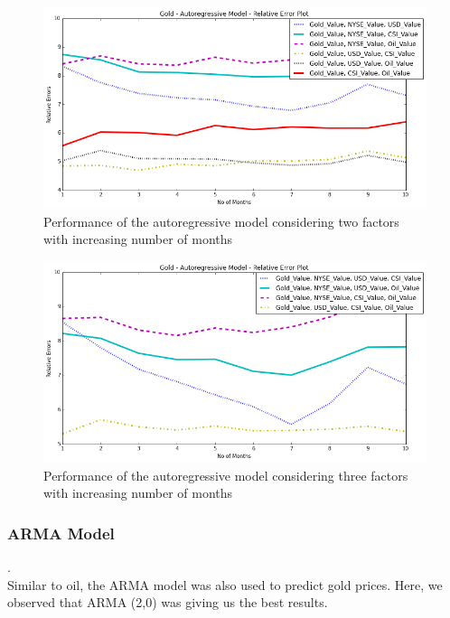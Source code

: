 \documentclass[runningheads]{llncs}
\begin{document}
\begin{figure}
\centering
\includegraphics[width=\textwidth]{gold_autoregressive_2factors_10.png}
\caption{Performance of the autoregressive model considering two factors with increasing number of months}
\label{fig:gold_autoregressive_2factors_10.png}
\end{figure}

\begin{figure}
\centering
\includegraphics[width=\textwidth]{gold_autoregressive_3factors_10.png}
\caption{Performance of the autoregressive model considering three factors with increasing number of months}
\label{fig:gold_autoregressive_3factors_10.png}
\end{figure}

\newpage
\subsubsection {ARMA Model}.\\

Similar to oil, the ARMA model was also used to predict gold prices. Here, we observed that ARMA (2,0) was giving us the best results.
\end{document}
